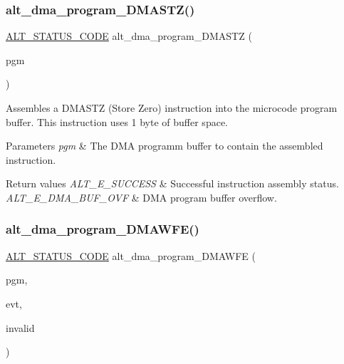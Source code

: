 \subsubsection{\texorpdfstring{alt\_dma\_program\_DMASTZ()}{alt\_dma\_program\_DMASTZ()}}
{\footnotesize\ttfamily \mbox{\hyperlink{hwlib_8h_abdb0d369f069723ca55d6c94bcaaaa12}{A\+L\+T\+\_\+\+S\+T\+A\+T\+U\+S\+\_\+\+C\+O\+DE}} alt\+\_\+dma\+\_\+program\+\_\+\+D\+M\+A\+S\+TZ (\begin{DoxyParamCaption}\item[{\mbox{\hyperlink{group__ALT__DMA__PRG_gadb7028531574894854db4db6d797de97}{A\+L\+T\+\_\+\+D\+M\+A\+\_\+\+P\+R\+O\+G\+R\+A\+M\+\_\+t}} $\ast$}]{pgm }\end{DoxyParamCaption})}

Assembles a D\+M\+A\+S\+TZ (Store Zero) instruction into the microcode program buffer. This instruction uses 1 byte of buffer space.


\begin{DoxyParams}{Parameters}
{\em pgm} & The D\+MA programm buffer to contain the assembled instruction.\\
\hline
\end{DoxyParams}

\begin{DoxyRetVals}{Return values}
{\em A\+L\+T\+\_\+\+E\+\_\+\+S\+U\+C\+C\+E\+SS} & Successful instruction assembly status. \\
\hline
{\em A\+L\+T\+\_\+\+E\+\_\+\+D\+M\+A\+\_\+\+B\+U\+F\+\_\+\+O\+VF} & D\+MA program buffer overflow. \\
\hline
\end{DoxyRetVals}
\mbox{\label{group__ALT__DMA__PRG_gadb60b4036a6e054f81b4e2bf2dfb2223}} 
\subsubsection{\texorpdfstring{alt\_dma\_program\_DMAWFE()}{alt\_dma\_program\_DMAWFE()}}
{\footnotesize\ttfamily \mbox{\hyperlink{hwlib_8h_abdb0d369f069723ca55d6c94bcaaaa12}{A\+L\+T\+\_\+\+S\+T\+A\+T\+U\+S\+\_\+\+C\+O\+DE}} alt\+\_\+dma\+\_\+program\+\_\+\+D\+M\+A\+W\+FE (\begin{DoxyParamCaption}\item[{\mbox{\hyperlink{group__ALT__DMA__PRG_gadb7028531574894854db4db6d797de97}{A\+L\+T\+\_\+\+D\+M\+A\+\_\+\+P\+R\+O\+G\+R\+A\+M\+\_\+t}} $\ast$}]{pgm,  }\item[{\mbox{\hyperlink{group__ALT__DMA__COMMON_gad02f1735ad41b201414e8d032e0f9426}{A\+L\+T\+\_\+\+D\+M\+A\+\_\+\+E\+V\+E\+N\+T\+\_\+t}}}]{evt,  }\item[{bool}]{invalid }\end{DoxyParamCaption})}

